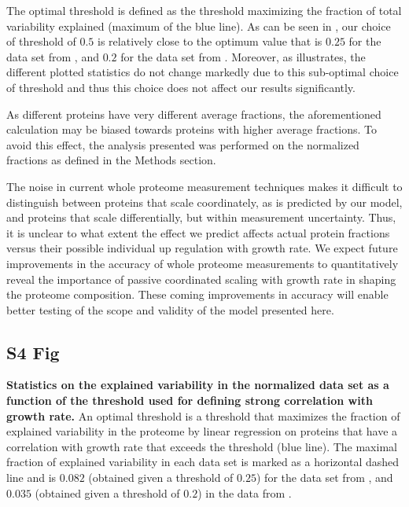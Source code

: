 \documentclass[10pt,letterpaper]{article}
\newcommand{\hMaxExpVar}{0.082}
\newcommand{\vnMaxExpVar}{0.035}
\newcommand{\vMaxExpVar}{\vnMaxExpVar{}}
\begin{document}
The optimal threshold is defined as the threshold maximizing the fraction of total variability explained (maximum of the blue line).
As can be seen in , our choice of threshold of $0.5$ is relatively close to the optimum value that is $0.25$ for the data set from \cite{Schmidt2015}, and $0.2$ for the data set from \cite{Peebo_2015}.
Moreover, as  illustrates, the different plotted statistics do not change markedly due to this sub-optimal choice of threshold and thus this choice does not affect our results significantly.

As different proteins have very different average fractions, the aforementioned calculation may be biased towards proteins with higher average fractions.
To avoid this effect, the analysis presented was performed on the normalized fractions as defined in the Methods section.

The noise in current whole proteome measurement techniques makes it difficult to distinguish between proteins that scale coordinately, as is predicted by our model, and proteins that scale differentially, but within measurement uncertainty.
Thus, it is unclear to what extent the effect we predict affects actual protein fractions versus their possible individual up regulation with growth rate.
We expect future improvements in the accuracy of whole proteome measurements to quantitatively reveal the importance of passive coordinated scaling with growth rate in shaping the proteome composition. These coming improvements in accuracy will enable better testing of the scope and validity of the model presented here.

\subsection*{S4 Fig}
\label{fig:threshold}
    {\bf Statistics on the explained variability in the normalized data set as a function of the threshold used for defining strong correlation with growth rate.}
  An optimal threshold is a threshold that maximizes the fraction of explained variability in the proteome by linear regression on proteins that have a correlation with growth rate that exceeds the threshold (blue line).
  The maximal fraction of explained variability in each data set is marked as a horizontal dashed line and is $\hMaxExpVar{}$ (obtained given a threshold of $0.25$) for the data set from \cite{Schmidt2015}, and $\vMaxExpVar{}$ (obtained given a threshold of $0.2$) in the data from \cite{Peebo_2015}.
%
\end{document}
